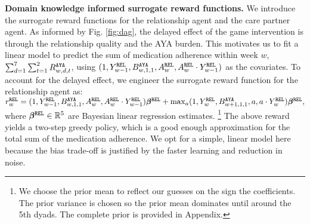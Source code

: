 \textbf{Domain knowledge informed surrogate reward functions.} We introduce the surrogate reward functions for the relationship agent and the care partner agent. As informed by Fig. \ref{fig:dag}, the delayed effect of the game intervention is through the relationship quality and the AYA burden. 
This motivates us to fit a linear model to predict the sum of medication adherence within week $w$, $\sum_{d=1}^{7} \sum_{t=1}^{2} R_{w,d,t}^{\tiny\texttt{AYA}}$, using $(1, Y_{w-1}^{\tiny\texttt{REL}}, {B}_{w, 1, 1}^{\tiny\texttt{AYA}}, A_{w}^{\tiny\texttt{REL}}, A_w^{\tiny\texttt{REL}} \cdot Y_{w-1}^{\tiny\texttt{REL}})$ as the covariates. 
To account for the delayed effect, we engineer the surrogate reward function for the relationship agent as:
$r_{w}^{\tiny\texttt{REL}} = (1, Y_{w-1}^{\tiny\texttt{REL}}, {B}_{w, 1, 1}^{\tiny\texttt{AYA}}, A_{w}^{\tiny\texttt{REL}}, A_w^{\tiny\texttt{REL}} \cdot Y_{w-1}^{\tiny\texttt{REL}}){\bm{\beta}}^{\tiny\texttt{REL}}  
 + \max_{a}(1, Y_{w}^{\tiny\texttt{REL}}, {B}_{w+1, 1, 1}^{\tiny\texttt{AYA}}, a, a \cdot Y_{w}^{\tiny\texttt{REL}}) {\bm{\beta}}^{\tiny\texttt{REL}},$ where ${\bm{\beta}}^{\tiny\texttt{REL}} \in \mathbb{R}^{5}$ are Bayesian linear regression estimates. 
 \footnote{We choose the prior mean to reflect our guesses on the sign the coefficients. The prior variance is chosen so the prior mean dominates until around the 5th dyads. The complete prior is provided in Appendix.} 
The above reward yields a two-step greedy policy, which is a good enough approximation for the total sum of the medication adherence. We opt for a simple, linear model here because the bias trade-off is justified by the faster learning and reduction in noise. 

